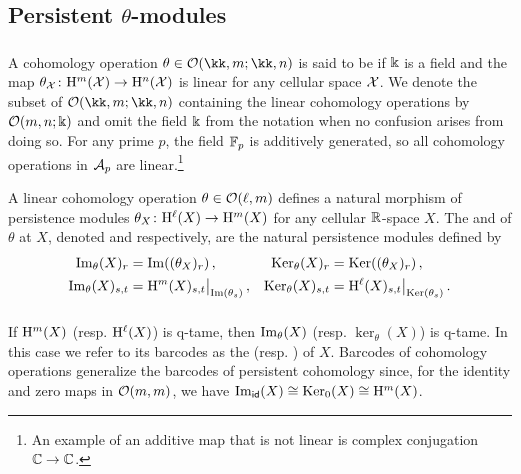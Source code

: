 
\subsection{Persistent $\theta$-modules}

\subsubsection{}
\label{ss:theta-modules}

A cohomology operation $\theta \in \cO(\kk,m; \kk,n)$ is said to be  if $\Bbbk$ is a field and the map $\theta_{\mathcal{X}} \colon \mathrm{H}^m(\mathcal{X}) \to \mathrm{H}^n(\mathcal{X})$ is linear for any cellular space $\mathcal{X}$.
We denote the subset of $\cO(\kk,m; \kk,n)$ containing the linear cohomology operations by $\mathcal{O}(m,n;\Bbbk)$ and omit the field \(\Bbbk\) from the notation when no confusion arises from doing so.
For any prime $p$, the field ${\mathbb{F}_p}$ is additively generated, so all cohomology operations in $\mathcal{A}_p$ are linear.\footnote{An example of an additive map that is not linear is complex conjugation $\mathbb{C} \to \mathbb{C}$.}

A linear cohomology operation \(\theta \in \mathcal{O}(\ell,m)\) defines a natural morphism of persistence modules $\theta_X \colon \mathrm{H}^\ell(X) \to \mathrm{H}^m(X)$ for any cellular $\mathbb{R}$-space $X$.
The  and  of $\theta$ at \(X\), denoted  and  respectively, are the natural persistence modules defined by
\begin{align*}
	\operatorname{Im}_\theta(X)_r &= \operatorname{Im}((\theta_X)_r)\,, &
	\operatorname{Ker}_\theta(X)_r &= \operatorname{Ker}((\theta_X)_r)\,, \\
	\operatorname{Im}_\theta(X)_{s,t} &= \mathrm{H}^m(X)_{s,t}\big|_{\operatorname{Im}(\theta_s)}\,, &
	\operatorname{Ker}_\theta(X)_{s,t} &= \mathrm{H}^\ell(X)_{s,t}\big|_{\operatorname{Ker}(\theta_s)}\,.
\end{align*}

\subsubsection{}
\label{ss:theta-modules-q-tame}
If $\mathrm{H}^m(X)$ (resp. \(\mathrm{H}^\ell(X)\)) is q-tame, then $\operatorname{Im}_\theta(X)$ (resp. $\ker_\theta(X)$) is q-tame.
In this case we refer to its barcodes as the  (resp. ) of \(X\).
Barcodes of cohomology operations generalize the barcodes of persistent cohomology since, for the identity and zero maps in $\mathcal{O}(m,m)$, we have $\operatorname{Im}_{\mathsf{id}}(X) \cong \operatorname{Ker}_0(X) \cong \mathrm{H}^m(X)$.

